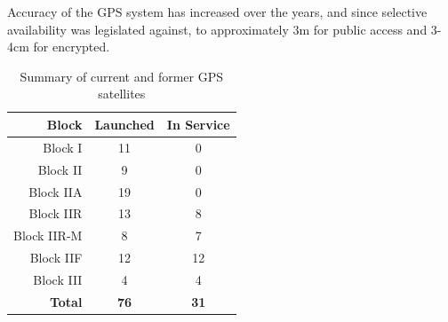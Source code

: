Accuracy of the GPS system has increased over the years, and since selective availability was legislated against, to approximately 3m for public access and 3-4cm for
encrypted.


\renewcommand{\arraystretch}{1.5}
\begin{table}
    \begin{center}
        \caption{Summary of current and former GPS satellites}
        \label{tab:GPSSatSum}
        \begin{tabular}{ r|c|c }
            \hline
            \textbf{Block} & \textbf{Launched} & \textbf{In Service} \\
            \hline
            Block I & 11 & 0\\
            Block II & 9 & 0\\
            Block IIA & 19 & 0\\
            Block IIR & 13 & 8\\
            Block IIR-M & 8 & 7\\
            Block IIF & 12 & 12\\
            Block III & 4 & 4\\
            \hline
            \textbf{Total} & \textbf{76} & \textbf{31}\\
            \hline
        \end{tabular}
    \end{center}
\end{table}
\renewcommand{\arraystretch}{1}

